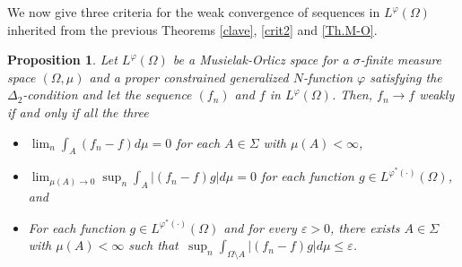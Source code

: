 \documentclass[11pt,a4paper]{amsart}
\newtheorem{proposicion}[definicion]{Proposition}
\newcommand{\lphi}{{L^{\varphi}(\Omega)}}
\begin{document}
We now give three criteria for the weak convergence of sequences in $\lphi$ inherited from the previous Theorems \ref{clave}, \ref{crit2} and \ref{Th.M-O}.

\begin{proposicion}\label{sucesiones1}
Let $\lphi$ be a Musielak-Orlicz space for a $\sigma$-finite measure space $(\Omega,\mu)$ and a proper constrained generalized $N$-function $\varphi$ satisfying the $\Delta_2$-condition and let the sequence $(f_{n})$ and $f$ in $\lphi$. Then, $f_{n}\rightarrow f$ weakly if and only if all the three
\begin{itemize}
\item [($i$)] $\lim_{n} \int_{A} (f_{n}-f) d\mu = 0$ for each $A\in \Sigma$ with $\mu(A)<\infty$,
    \item [($ii$)] $\lim_{\mu(A)\rightarrow 0} \sup_{n} \int_A \vert (f_{n}-f) g\vert d\mu = 0$ for each function $g\in L^{\varphi^{*}(\cdot)}(\Omega)$, and
    \item [($iii$)] For each function $g\in L^{\varphi^{*}(\cdot)}(\Omega)$ and for every $\varepsilon>0$, there exists $A\in \Sigma$ with $\mu(A)<\infty$ such that $\, \sup_{n} \int_{\Omega\setminus A} \vert (f_{n}-f) g\vert d\mu \leq\varepsilon$.
\end{itemize}
\end{proposicion}
\end{document}
